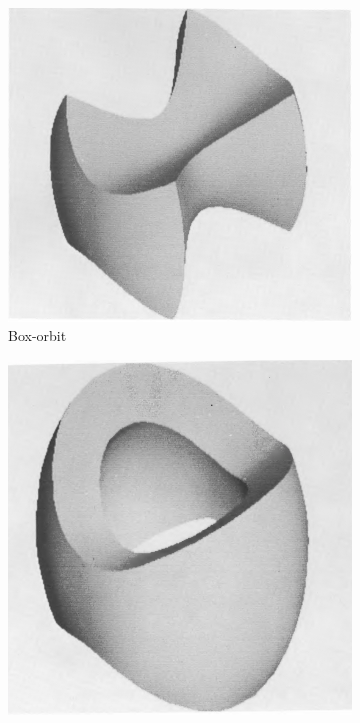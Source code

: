 \documentclass[english, twoside]{HYgradu}
\begin{document}
\begin{figure}
	\centering
	\begin{subfigure}[b]{0.49\textwidth}
		\includegraphics[width=\textwidth]{statler_box.png}
		\caption{Box-orbit}
	\end{subfigure}
	\begin{subfigure}[b]{0.49\textwidth}
		\includegraphics[width=\textwidth]{statler_short_tube.png}

\end{subfigure}
\end{figure}
\end{document}
